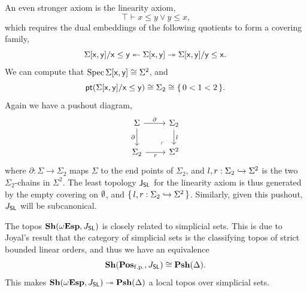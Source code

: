 \begin{example}[\AxiomSL]
  An even stronger axiom is the linearity axiom, 
  \[ \top \vdash x \le y \vee y \le x\text{,} \]
  which requires the dual embeddings of the following quotients to form a covering family,
  \[ \Sigma[\ms{x},\ms{y}]/\ms{x} \le \ms{y} \twoheadleftarrow \Sigma[\ms{x},\ms{y}] \surj \Sigma[\ms{x},\ms{y}]/\ms{y} \le \ms{x}\text{.} \]
  We can compute that $\operatorname{Spec} \Sigma[\mathsf{x},\mathsf{y}] \cong \Sigma^2$, and 
  \[ \pt(\Sigma[\ms{x},\ms{y}]/\ms{x} \le \ms{y}) \cong \Sigma_2 \cong \set{0 < 1 < 2}\text{.} \]
  Again we have a pushout diagram,
  \[
  \begin{tikzcd}
    \Sigma \ar[r, "\partial"] \ar[d, "\partial"'] & \Sigma_2 \ar[d, "l"] \\ 
    \Sigma_2 \ar[r, "r"'] & \Sigma^2
    \arrow["\lrcorner"{anchor=center, pos=0.125, rotate=180}, draw=none, from=2-2, to=1-1]
  \end{tikzcd}
  \]
  where $\partial : \Sigma \to \Sigma_2$ maps $\Sigma$ to the end points of $\Sigma_2$, and $l,r : \Sigma_2 \hookrightarrow \Sigma^2$ is the two $\Sigma_2$-chains in $\Sigma^2$. The least topology $\mathsf{J}_{\mathsf{SL}}$ for the linearity axiom is thus generated by the empty covering on $\emptyset$, and $\{\,l,r : \Sigma_2 \hookrightarrow \Sigma^2\,\}$. Similarly, given this pushout, $J_{\mathsf{SL}}$ will be subcanonical.

  The topos $\mathbf{Sh}(\omega\mathbf{Esp},J_{\mathsf{SL}})$ is closely related to simplicial sets. This is due to Joyal's result that the category of simplicial sets is the classifying topos of strict bounded linear orders, and thus we have an equivalence 
  \[ \sh(\Pos\fp,J_{\ms{SL}}) \cong \psh(\Delta)\text{.} \]
  This makes $\mathbf{Sh}(\omega\mathbf{Esp},J_{\mathsf{SL}}) \twoheadrightarrow \mathbf{Psh}(\Delta)$ a local topos over simplicial sets.
\end{example}

